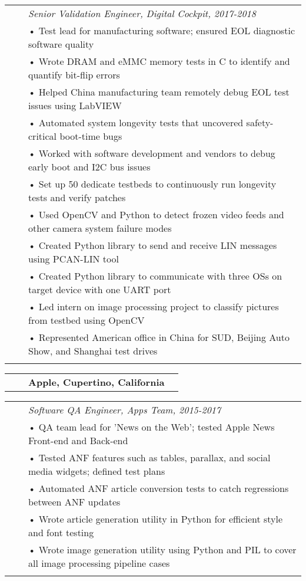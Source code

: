 \documentclass{minimal}
\begin{document}
\begin{tabular}{ p{1.5cm} p{1cm} p{16cm} }
& & \textit{Senior Validation Engineer, Digital Cockpit, 2017-2018}\\
& & • Test lead for manufacturing software; ensured EOL diagnostic software quality\\
& & • Wrote DRAM and eMMC memory tests in C to identify and quantify bit-flip errors\\
& & • Helped China manufacturing team remotely debug EOL test issues using LabVIEW\\
& & • Automated system longevity tests that uncovered safety-critical boot-time bugs\\
& & • Worked with software development and vendors to debug early boot and I2C bus issues\\
& & • Set up 50 dedicate testbeds to continuously run longevity tests and verify patches\\
& & • Used OpenCV and Python to detect frozen video feeds and other camera system failure modes\\
& & • Created Python library to send and receive LIN messages using PCAN-LIN tool\\
& & • Created Python library to communicate with three OSs on target device with one UART port\\
& & • Led intern on image processing project to classify pictures from testbed using OpenCV\\
& & • Represented American office in China for SUD, Beijing Auto Show, and Shanghai test drives\\
& & \\
\end{tabular}

\begin{tabular}{ p{1.5cm} p{1cm} p{10cm} >{\raggedleft\arraybackslash}p{3cm} }
& & \textbf{Apple, Cupertino, California} & \\
\end{tabular}

\begin{tabular}{ p{1.5cm} p{1cm} p{16cm} }
& & \textit{Software QA Engineer, Apps Team, 2015-2017}\\
& & • QA team lead for 'News on the Web'; tested Apple News Front-end and Back-end\\
& & • Tested ANF features such as tables, parallax, and social media widgets; defined test plans\\
& & • Automated ANF article conversion tests to catch regressions between ANF updates\\
& & • Wrote article generation utility in Python for efficient style and font testing\\
& & • Wrote image generation utility using Python and PIL to cover all image processing pipeline cases\\
& & \\
\end{tabular}
\end{document}
